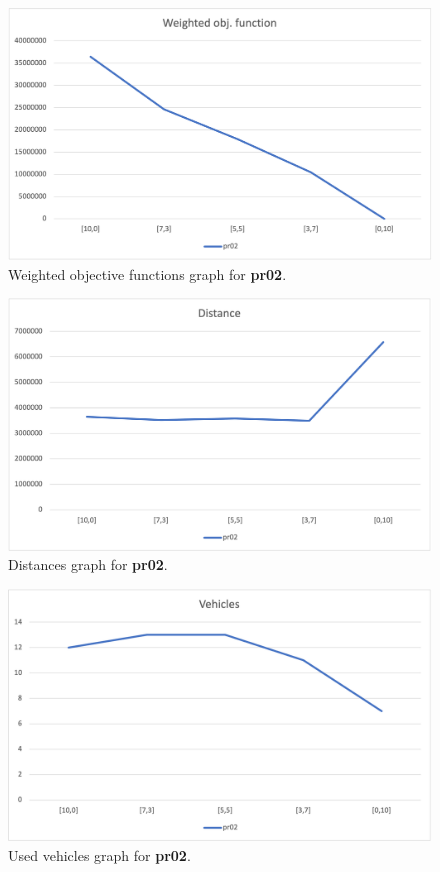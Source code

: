 \begin{figure}[H]
    \centering
    \includegraphics[height=0.25\textheight]{../graphs/pr02-wobjf.png}
    \caption{Weighted objective functions graph for \textbf{pr02}.}
\end{figure}

\begin{figure}[H]
    \centering
    \includegraphics[height=0.25\textheight]{../graphs/pr02-distance.png}
    \caption{Distances graph for \textbf{pr02}.}
\end{figure}

\begin{figure}[H]
    \centering
    \includegraphics[height=0.25\textheight]{../graphs/pr02-vehicles.png}
    \caption{Used vehicles graph for \textbf{pr02}.}
\end{figure}

\newpage